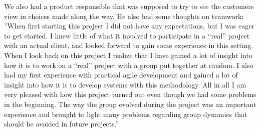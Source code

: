 \newline
\newline
We also had a product responsible that was supposed to try to see the customers view in choices made along the way. He also had some thoughts on teamwork:
\newline
\newline
''When first starting this project I did not have any expectations, but I was eager to get started. I knew little of what it involved to participate in a “real” project with an actual client, and looked forward to gain some experience in this setting.
\newpage
When I look back on this project I realize that I have gained a lot of insight into how it is to work on a “real” project with a group put together at random. I also had my first experience with practical agile development and gained a lot of insight into how it is to develop systems with this methodology. All in all I am very pleased with how this project turned out even though we had some problems in the beginning. The way the group evolved during the project was an important experience and brought to light many problems regarding group dynamics that should be avoided in future projects.''

